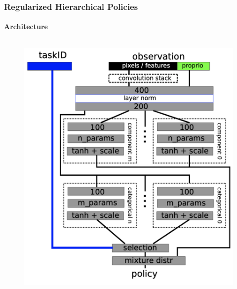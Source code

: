 \documentclass{beamer}
\begin{document}
\begin{frame}
	\frametitle{Regularized Hierarchical Policies}
	\framesubtitle{Architecture}
	
	\begin{columns}
		
	\end{columns}

	\begin{columns}
		\column{0.5\textwidth}
		\begin{figure}[H]
			\includegraphics[scale=0.3]{rhpo-arch.png}
		\end{figure}
	

\end{columns}
\end{frame}
\end{document}
